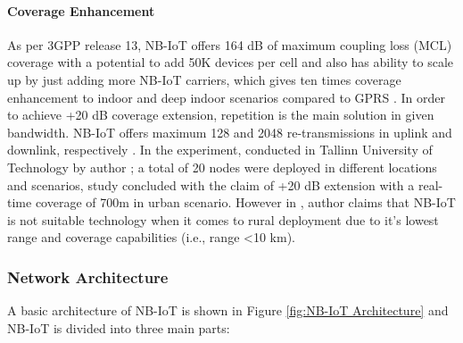 \documentclass[12pt]{article}
\begin{document}
\paragraph{Coverage Enhancement}
As per 3GPP release 13, NB-IoT offers 164 dB of maximum coupling loss (MCL) coverage with a potential to add 50K devices per cell and also has ability to scale up by just adding more NB-IoT carriers, which gives ten times coverage enhancement to indoor and deep indoor scenarios compared to GPRS \cite{farrell2018low,3GPP,raza2017low}. In order to achieve +20 dB coverage extension, repetition is the main solution in given bandwidth. NB-IoT offers maximum 128 and 2048 re-transmissions in uplink and downlink, respectively \cite{bao2018coverage,mwakwata2019narrowband}. In the experiment, conducted in Tallinn University of Technology by author \cite{malik2019nb}; a total of 20 nodes were deployed in different locations and scenarios, study concluded with the claim of +20 dB extension with a real-time coverage of 700m in urban scenario. However in \cite{mekki2019comparative}, author claims that NB-IoT is not suitable technology when it comes to rural deployment due to it's lowest range and coverage capabilities (i.e., range <10 km).

\subsubsection{Network Architecture}

A basic architecture of NB-IoT is shown in Figure \ref{fig:NB-IoT Architecture} and NB-IoT is divided into three main parts:
\end{document}
